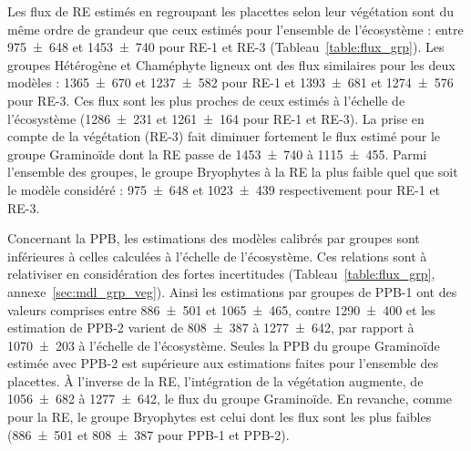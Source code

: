 Les flux de RE estimés en regroupant les placettes selon leur végétation sont du même ordre de grandeur que ceux estimés pour l'ensemble de l'écosystème : entre \num{975(648)} et \SI{1453(740)}{\gcma} pour RE-1 et RE-3 (Tableau~\ref{table:flux_grp}).
Les groupes Hétérogène et Chaméphyte ligneux ont des flux similaires pour les deux modèles : \num{1365(670)} et \SI{1237(582)}{\gcma} pour RE-1 et \num{1393(681)} et \SI{1274(576)}{\gcma} pour RE-3.
Ces flux sont les plus proches de ceux estimés à l'échelle de l'écosystème (\num{1286(231)} et \SI{1261(164)}{\gcma} pour RE-1 et RE-3).
La prise en compte de la végétation (RE-3) fait diminuer fortement le flux estimé pour le groupe Graminoïde dont la RE passe de \num{1453(740)} à \SI{1115(455)}{\gcma}.
Parmi l'ensemble des groupes, le groupe Bryophytes à la RE la plus faible quel que soit le modèle considéré : \num{975(648)} et \SI{1023(439)}{\gcma} respectivement pour RE-1 et RE-3.

Concernant la PPB, les estimations des modèles calibrés par groupes sont inférieures à celles calculées à l'échelle de l'écosystème.
Ces relations sont à relativiser en considération des fortes incertitudes (Tableau~\ref{table:flux_grp}, annexe~\ref{sec:mdl_grp_veg}).
Ainsi les estimations par groupes de PPB-1 ont des valeurs comprises entre \num{886(501)} et \SI{1065(465)}{\gcma}, contre \SI{1290(400)}{\gcma} et les estimation de PPB-2 varient de \num{808(387)} à \SI{1277(642)}{\gcma}, par rapport à \SI{1070(203)}{\gcma} à l'échelle de l'écosystème.
Seules la PPB du groupe Graminoïde estimée avec PPB-2 est supérieure aux estimations faites pour l'ensemble des placettes.
À l'inverse de la RE, l'intégration de la végétation augmente, de \num{1056(682)} à \SI{1277(642)}{\gcma}, le flux du groupe Graminoïde.
En revanche, comme pour la RE, le groupe Bryophytes est celui dont les flux sont les plus faibles (\num{886(501)} et \SI{808(387)}{\gcma} pour PPB-1 et PPB-2).

